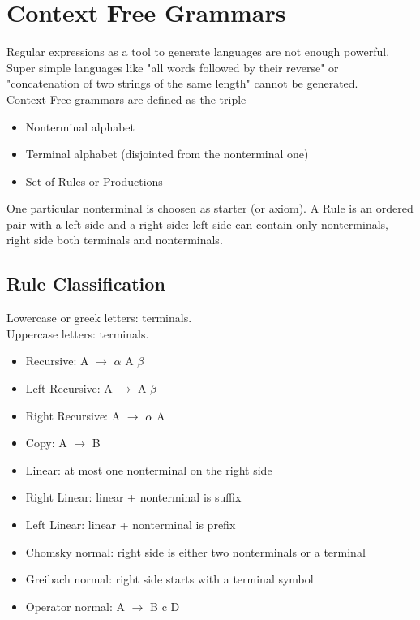 \chapter{Context Free Grammars}
	Regular expressions as a tool to generate languages are not enough powerful. Super simple languages like "all words followed by their reverse" or "concatenation of two strings of the same length" cannot be generated.\\
	Context Free grammars are defined as the triple
	\begin{itemize}
		\item Nonterminal alphabet
		\item Terminal alphabet (disjointed from the nonterminal one)
		\item Set of Rules or Productions
	\end{itemize}
	One particular nonterminal is choosen as starter (or axiom). A Rule is an ordered pair with a left side and a right side: left side can contain only nonterminals, right side both terminals and nonterminals. 
	
	\section{Rule Classification}
	    Lowercase or greek letters: terminals.\\
	    Uppercase letters: terminals.
	    \begin{itemize}
	        \item Recursive: A $\rightarrow$ $\alpha$ A $\beta$ 
	        \item Left Recursive: A $\rightarrow$ A $\beta$ 
	        \item Right Recursive: A $\rightarrow$ $\alpha$ A
	        \item Copy: A $\rightarrow$ B
	        \item Linear: at most one nonterminal on the right side
	        \item Right Linear: linear + nonterminal is suffix
	        \item Left Linear: linear + nonterminal is prefix
	        \item Chomsky normal: right side is either two nonterminals or a terminal
	        \item Greibach normal: right side starts with a terminal symbol
	        \item Operator normal: A $\rightarrow$ B c D
	    \end{itemize}
    
